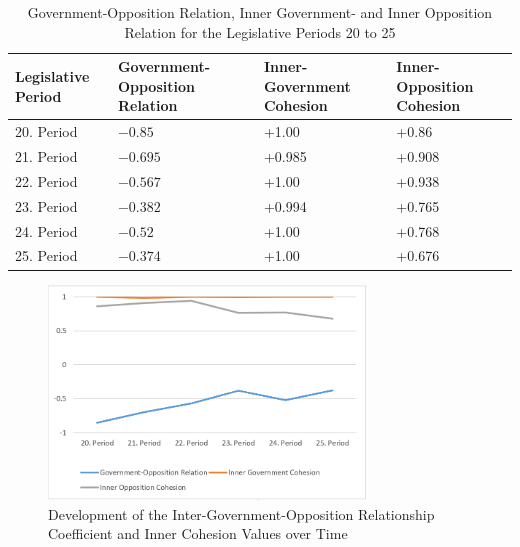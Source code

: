 \begin{table}[h]

\centering
\bgroup
\def\arraystretch{1.2}
\begin{tabular}{| p{2cm} | p{3cm} | p{3cm} | p{3cm} |}
\hline
  Legislative Period & Government-Opposition Relation & Inner-Government Cohesion & Inner-Opposition Cohesion \\
\hline
\hline
  20. Period & $-0.85$ & +1.00 & +0.86 \\
\hline
  21. Period & $-0.695$ & +0.985 & +0.908 \\
\hline
  22. Period & $-0.567$ & +1.00 & +0.938 \\
\hline
  23. Period & $-0.382$ & +0.994 & +0.765\\
\hline
  24. Period & $-0.52$ & +1.00 & +0.768\\
\hline
  25. Period & $-0.374$ & +1.00 & +0.676\\
\hline

\end{tabular}
\egroup
\caption{Government-Opposition Relation, Inner Government- and Inner Opposition Relation for the Legislative Periods 20 to 25}
\label{table:gov_opp_relation}
\end{table}

\begin{figure}
\center
	\includegraphics[width=0.75\textwidth]{imgs/gov_opp_rel_graph}
	\caption{Development of the Inter-Government-Opposition Relationship Coefficient and Inner Cohesion Values over Time}
	\label{fig:gov_opp_relation}
\end{figure}